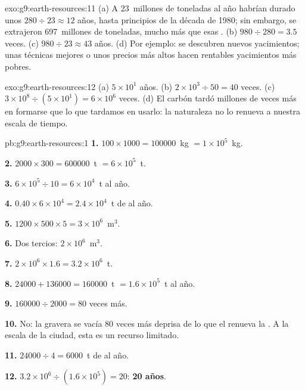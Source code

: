 \begin{solution}{exo:g9:earth-resources:11}
(a) A 23~millones de toneladas al año habrían durado unos $280 \div 23
\approx 12$ años, hasta principios de la década de 1980; sin embargo, se
extrajeron 697~millones de toneladas, mucho más que esas .
(b) $980 \div 280 = 3.5$ veces. (c) $980 \div
23 \approx 43$ años. (d) Por ejemplo: se descubren nuevos yacimientos;
unas técnicas mejores o unos precios más altos hacen rentables
yacimientos más pobres.
\end{solution}

\begin{solution}{exo:g9:earth-resources:12}
(a) $5 \times 10^1$ años. (b) $2 \times 10^3 \div 50 = 40$ veces. (c) $3
\times 10^8 \div (5 \times 10^1) = 6 \times 10^6$ veces. (d) El carbón
tardó millones de veces más en formarse que lo que tardamos en usarlo: la
naturaleza no lo renueva a nuestra escala de tiempo.
\end{solution}

\begin{solution}{pb:g9:earth-resources:1}
\textbf{1.} $100 \times 1000 = \num{100000}$~kg $= 1 \times 10^5$~kg.

\textbf{2.} $2000 \times 300 = \num{600000}$~t $= 6 \times 10^5$~t.

\textbf{3.} $6 \times 10^5 \div 10 = 6 \times 10^4$~t al año.

\textbf{4.} $0.40 \times 6 \times 10^4 = 2.4 \times 10^4$~t de  al
año.

\textbf{5.} $1200 \times 500 \times 5 = 3 \times 10^6$~m$^3$.

\textbf{6.} Dos tercios: $2 \times 10^6$~m$^3$.

\textbf{7.} $2 \times 10^6 \times 1.6 = 3.2 \times 10^6$~t.

\textbf{8.} $\num{24000} + \num{136000} = \num{160000}$~t $= 1.6 \times
10^5$~t al año.

\textbf{9.} $\num{160000} \div 2000 = 80$ veces más.

\textbf{10.} No: la gravera se vacía 80 veces más deprisa de lo que el 
renueva la . A la escala de la ciudad, esta  es un recurso
limitado.

\textbf{11.} $\num{24000} \div 4 = \num{6000}$~t de  al año.

\textbf{12.} $3.2 \times 10^6 \div (1.6 \times 10^5) = 20$: \textbf{20 años}.
\end{solution}
